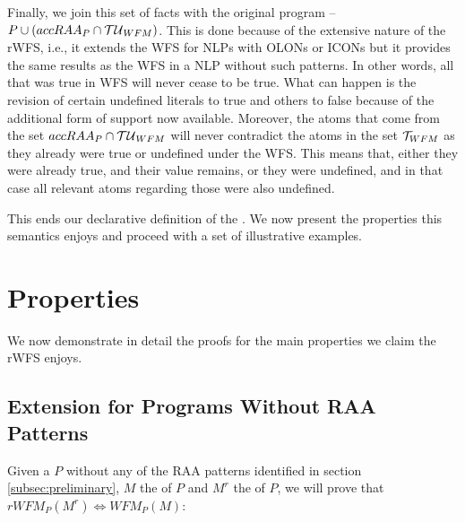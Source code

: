 Finally, we join this set of facts with the original program -- $P\cup \left(accRAA_{P}\cap {\cal{TU}}_{WFM}\right)$. This is done because of the extensive nature of the rWFS, i.e., it extends the WFS for NLPs with OLONs or ICONs but it provides the same results as the WFS in a NLP without such patterns. In other words, all that was true in WFS will never cease to be true. What can happen is the revision of certain undefined literals to true and others to false because of the additional form of support now available. Moreover, the atoms that come from the set $accRAA_{P}\cap {\cal{TU}}_{WFM}$ will never contradict the atoms in the set ${\cal{T}}_{WFM}$ as they already were true or undefined under the WFS. This means that, either they were already true, and their value remains, or they were undefined, and in that case all relevant atoms regarding those were also undefined.

This ends our declarative definition of the \rwfs. We now present the properties this semantics enjoys and proceed with a set of illustrative examples.





\section{Properties}
We now demonstrate in detail the proofs for the main properties we claim the rWFS enjoys.




\subsection{\WFS Extension for Programs Without RAA Patterns}
Given a \NLP $P$ without any of the RAA patterns identified in section \ref{subsec:preliminary}, $M$ the \wfm of $P$ and $M^{r}$ the \rwfm of $P$, we will prove that $rWFM_{P}(M^{r})\Leftrightarrow WFM_{P}(M)$:

